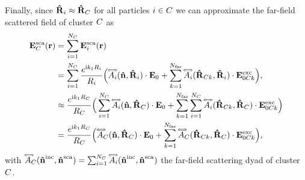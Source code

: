 Finally, since $\mathbf{\hat{R}}_i\approx\mathbf{\hat{R}}_C$ for all particles $i\in C$ we can approximate the far-field scattered field of cluster $C$ as
\begin{align}
\ScaEField_\Cls(\px) & = \sum_{i=1}^{N_\Cls} \ScaEField_i(\px) \nonumber\\
& = \sum_{i=1}^{N_\Cls} \frac{e^{\img k_1 \tPx_i}}{\tPx_i} \Big(\ScaDyad_i(\dw,\dPx_i)\cdot\EField_0 + \sum_{k=1}^\Nfar \ScaDyad_i(\dPx_{\Cls k},\dPx_i)\cdot\ExcEField_{0\Cls k} \Big), \nonumber\\
& \approx \frac{e^{\img k_1 \tPx_\Cls}}{\tPx_\Cls}\Big( \sum_{i=1}^{N_\Cls} \ScaDyad_i(\dw,\dPx_\Cls)\cdot\EField_0 + \sum_{k=1}^\Nfar \sum_{i=1}^{N_\Cls} \ScaDyad_i(\dPx_{\Cls k},\dPx_\Cls)\cdot\ExcEField_{0\Cls k} \Big) \nonumber\\
& = \frac{e^{\img k_1 \tPx_\Cls}}{\tPx_\Cls}\Big( \ScaDyad_\Cls(\dw,\dPx_\Cls)\cdot\EField_0 + \sum_{k=1}^\Nfar \ScaDyad_\Cls(\dPx_{\Cls k},\dPx_\Cls)\cdot\ExcEField_{0\Cls k} \Big),
\label{eq:scatfieldcluster}
\end{align}
%
with $\accentset{\Longleftrightarrow}{A}_C(\mathbf{\hat{n}}^{\text{inc}},\mathbf{\hat{n}}^{\text{sca}})=\sum_{i=1}^{N_C}\accentset{\Longleftrightarrow}{A}_i(\mathbf{\hat{n}}^{\text{inc}},\mathbf{\hat{n}}^{\text{sca}})$ the far-field scattering dyad of cluster $C$.


